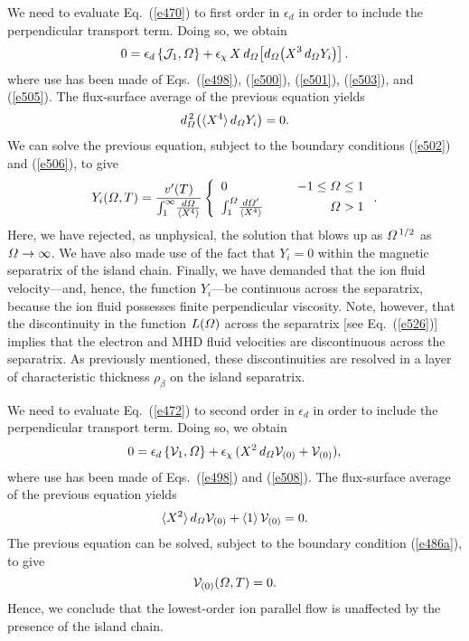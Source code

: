 \documentclass[12pt,prb,aps]{revtex4-1}
\begin{document}
We need to evaluate Eq.~(\ref{e470}) to first order in $\epsilon_d$ in order to include the perpendicular transport term. Doing so,
we obtain
\begin{equation}\label{e528a}
0 =\epsilon_d\,\{{\cal J}_1,{\mit\Omega}\} +\epsilon_\chi\,X\,d_{{\mit\Omega}}\!\left[d_{\mit\Omega}\!\left(X^3\,d_{\mit\Omega} Y_i\right)\right].
\end{equation}
where use has been made of Eqs.~(\ref{e498}), (\ref{e500}), (\ref{e501}), (\ref{e503}), and (\ref{e505}). The flux-surface average of the previous equation yields 
\begin{equation}
d_{\mit\Omega}^{\,2}\!\left(\langle X^4\rangle\,d_{\mit\Omega} Y_i\right)= 0.
\end{equation}
We can solve the previous equation, subject to the boundary conditions (\ref{e502}) and (\ref{e506}), to give\,\cite{fw}
\begin{equation}\label{e530}
Y_i({\mit\Omega},T)=\frac{v'(T)}{\int_1^\infty \!\frac{d{\mit\Omega}}{\langle X^4\rangle}}\left\{
\begin{array}{llr}
0&&-1\leq {\mit\Omega}\leq 1\\[0.5ex]
\int_1^{\mit\Omega}\! \frac{d{\mit\Omega}'}{\langle X^4\rangle}&~~&{\mit\Omega}>1
\end{array}\right..
\end{equation}
Here, we have rejected, as unphysical, the solution that blows up as ${\mit\Omega}^{\,1/2}$ as ${\mit\Omega}\rightarrow\infty$. 
We have also made use of the fact that $Y_i=0$ within the magnetic separatrix of the island chain. Finally, we have  demanded that the ion
fluid velocity---and, hence, the function $Y_i$---be continuous across the separatrix, because the ion fluid possesses finite perpendicular viscosity. 
Note, however, that the discontinuity in the function $L({\mit\Omega})$ across the separatrix [see Eq.~(\ref{e526})] implies that the
electron and MHD  fluid velocities are  discontinuous across the separatrix.  As previously
mentioned, these discontinuities are resolved in a layer of characteristic thickness $\rho_\beta$ on the island separatrix. 

We need to evaluate Eq.~(\ref{e472}) to second order in $\epsilon_d$ in order to include the perpendicular transport term. Doing so,
we obtain
\begin{equation}
0=\epsilon_d\,\{{\cal V}_1,{\mit\Omega}\} + \epsilon_\chi\,(X^2\,d_{\mit\Omega} {\cal V}_{(0)} + {\cal V}_{(0)}),
\end{equation}
where use has been made of Eqs.~(\ref{e498}) and (\ref{e508}). The flux-surface average of the
previous equation yields
\begin{equation}
\langle X^2\rangle\,d_{\mit\Omega} {\cal V}_{(0)} +\langle 1\rangle \,{\cal V}_{(0)}= 0.
\end{equation}
 The previous equation can be solved, subject to the boundary condition (\ref{e486a}), to
give
\begin{equation}
{\cal V}_{(0)}({\mit\Omega}, T) = 0.
\end{equation}
Hence, we conclude that the lowest-order ion parallel flow is unaffected by the presence of the island chain. 
\end{document}
